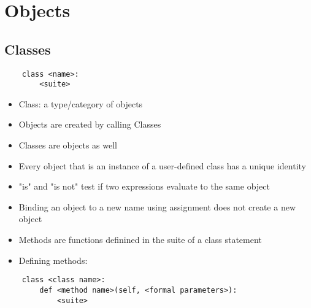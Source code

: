\chapter{Objects}

\section{Classes}
\begin{verbatim}
    class <name>:
        <suite>
\end{verbatim}
\begin{itemize}
    \item Class: a type/category of objects
    \item Objects are created by calling Classes
    \item Classes are objects as well
    \item Every object that is an instance of a user-defined class has a unique identity
    \item "is" and "is not" test if two expressions evaluate to the same object
    \item Binding an object to a new name using assignment does not create a new object
    \item Methods are functions definined in the suite of a class statement
    \item Defining methods:
\end{itemize}
\begin{verbatim}
    class <class name>:
        def <method name>(self, <formal parameters>):
            <suite>
\end{verbatim}
